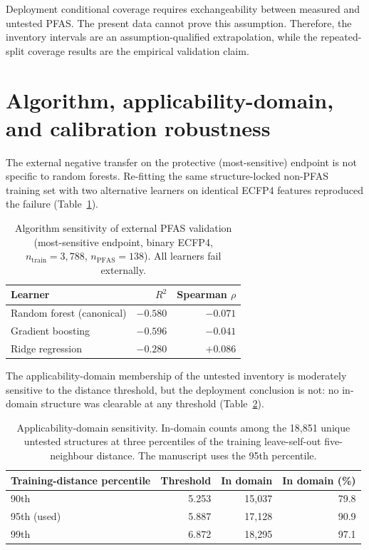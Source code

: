 \documentclass[11pt]{article}
\begin{document}
Deployment conditional coverage requires exchangeability between measured and untested
PFAS. The present data cannot prove this assumption. Therefore, the inventory intervals
are an assumption-qualified extrapolation, while the repeated-split coverage results are
the empirical validation claim.

\section{Algorithm, applicability-domain, and calibration robustness}

The external negative transfer on the protective (most-sensitive) endpoint is not specific
to random forests. Re-fitting the same structure-locked non-PFAS training set with two
alternative learners on identical ECFP4 features reproduced the failure (Table~\ref{tab:alg}).

\begin{table}[h]
\centering
\caption{Algorithm sensitivity of external PFAS validation (most-sensitive endpoint,
binary ECFP4, $n_{\mathrm{train}}=3{,}788$, $n_{\mathrm{PFAS}}=138$). All learners fail
externally.}
\label{tab:alg}
\begin{tabular}{lrr}
\toprule
Learner & $R^2$ & Spearman $\rho$ \\
\midrule
Random forest (canonical) & $-0.580$ & $-0.071$ \\
Gradient boosting & $-0.596$ & $-0.041$ \\
Ridge regression & $-0.280$ & $+0.086$ \\
\bottomrule
\end{tabular}
\end{table}

The applicability-domain membership of the untested inventory is moderately sensitive to
the distance threshold, but the deployment conclusion is not: no in-domain structure was
clearable at any threshold (Table~\ref{tab:ad}).

\begin{table}[h]
\centering
\caption{Applicability-domain sensitivity. In-domain counts among the 18,851 unique
untested structures at three percentiles of the training leave-self-out five-neighbour
distance. The manuscript uses the 95th percentile.}
\label{tab:ad}
\begin{tabular}{lrrr}
\toprule
Training-distance percentile & Threshold & In domain & In domain (\%) \\
\midrule
90th & 5.253 & 15,037 & 79.8 \\
95th (used) & 5.887 & 17,128 & 90.9 \\
99th & 6.872 & 18,295 & 97.1 \\
\bottomrule
\end{tabular}
\end{table}
\end{document}
